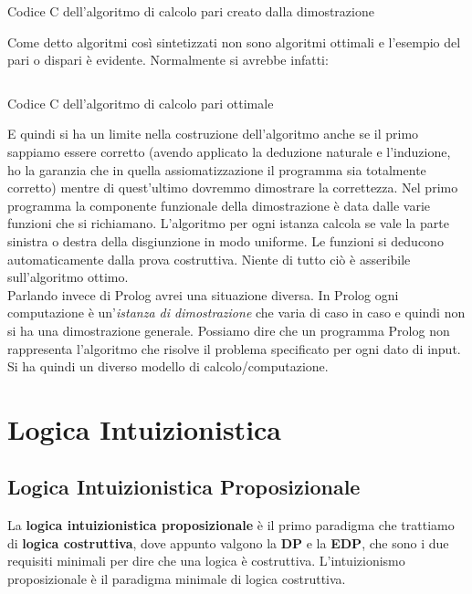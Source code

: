 \documentclass[a4paper,12pt, oneside]{book}
\begin{document}
\begin{listing}
  \inputminted{c}{``code/pari.c''}
  \label{lst:pari}
  \caption{Codice C dell'algoritmo di calcolo pari creato dalla dimostrazione}
\end{listing}
Come detto algoritmi così sintetizzati non sono algoritmi ottimali e l'esempio
del pari o dispari è evidente. Normalmente si avrebbe infatti:
\begin{listing}[H]
  \inputminted{c}{``code/pariopt.c''}
  \label{lst:pari2}
  \caption{Codice C dell'algoritmo di calcolo pari ottimale}
\end{listing}
E quindi si ha un limite nella costruzione dell'algoritmo anche se il primo
sappiamo essere corretto (avendo applicato la deduzione naturale e l'induzione,
ho la garanzia che in quella assiomatizzazione il programma sia totalmente
corretto) mentre di quest'ultimo dovremmo dimostrare la correttezza. Nel primo
programma la componente funzionale della dimostrazione è data dalle varie
funzioni che si richiamano. L'algoritmo per ogni istanza calcola se vale la
parte sinistra o destra della disgiunzione in modo uniforme. Le funzioni si
deducono automaticamente dalla prova costruttiva. Niente di tutto ciò è
asseribile sull'algoritmo ottimo.\\ 
Parlando invece di Prolog avrei una situazione diversa. In Prolog ogni
computazione è un'\textit{istanza di dimostrazione} che varia di caso in caso e
quindi non si ha una dimostrazione generale. Possiamo dire che un programma
Prolog non rappresenta l'algoritmo che risolve il problema specificato per ogni
dato di input. Si ha quindi un diverso modello di calcolo/computazione.
\chapter{Logica Intuizionistica}
\section{Logica Intuizionistica Proposizionale}
La \textbf{logica intuizionistica proposizionale} è il primo paradigma che
trattiamo di \textbf{logica costruttiva}, dove appunto valgono la \textbf{DP} e
la \textbf{EDP}, che sono i due requisiti minimali per dire che una logica è
costruttiva. L'intuizionismo proposizionale è il paradigma minimale di logica
costruttiva. 
\end{document}
